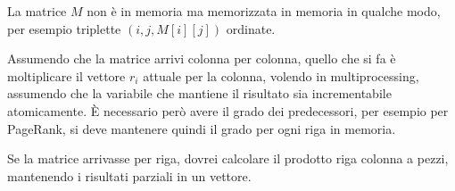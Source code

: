 La matrice $M$ non è in memoria ma memorizzata in memoria in qualche modo, per esempio
triplette $(i,j, M[i][j])$ ordinate.

Assumendo che la matrice arrivi colonna per colonna, quello che si fa è moltiplicare 
il vettore $r_i$ attuale per la colonna, volendo in multiprocessing, assumendo che la 
variabile che mantiene il risultato sia incrementabile atomicamente. 
È necessario però avere il grado dei predecessori, per esempio per PageRank, 
si deve mantenere quindi il grado per ogni riga in memoria.

Se la matrice arrivasse per riga, dovrei calcolare il prodotto riga colonna a pezzi, 
mantenendo i risultati parziali in un vettore.
